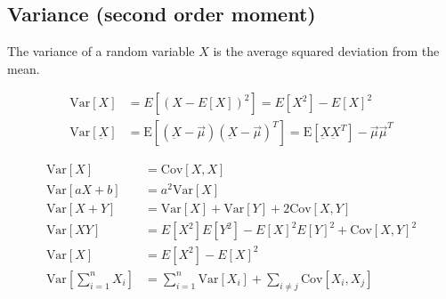 \begin{mdframed}[style=eqbox]
  \subsection{Variance (second order moment)}
  The variance of a random variable $X$ is the average squared deviation from the mean.
  \begin{mdframed}[style=redbox]
    \vspace*{-11pt}
    \begin{align*}
      \text{Var}[X] &= E[(X - E[X])^2] = E[X^2] - E[X]^2\\
      \text{Var}[\underbar{X}] &= \text{E}[(\underbar{X} - \vec{\mu})(\underbar{X} - \vec{\mu})^T] = \text{E}[\underbar{X}\underbar{X}^T] - \vec{\mu}\vec{\mu}^T
    \end{align*}
  \end{mdframed}
  \vspace*{-9pt}\begin{align*}
    \text{Var}[X] &= \text{Cov}[X,X]\\
    \text{Var}[aX + b] &= a^2 \text{Var}[X]\\
    \text{Var}[X + Y] &= \text{Var}[X] + \text{Var}[Y] + 2\text{Cov}[X,Y]\\
    \text{Var}[XY] &= E[X^2]E[Y^2] - E[X]^2E[Y]^2 + \text{Cov}[X,Y]^2\\
    \text{Var}[X] &= E[X^2] - E[X]^2\\
    \text{Var}\left[\sum_{i=1}^n X_i\right] &= \sum_{i=1}^n \text{Var}[X_i] + \sum_{i \neq j} \text{Cov}[X_i, X_j]
  \end{align*}
\end{mdframed}

